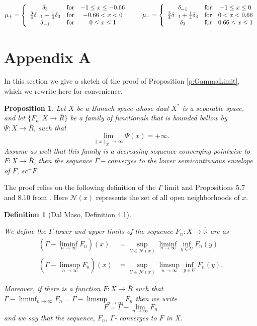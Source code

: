 \documentclass[11pt]{article}
\newcommand{\R}{\mathbb{R}}
\theoremstyle{plain}
\newtheorem*{Proposition*}{Proposition}
\newtheorem{Definition}[Lemma]{Definition}
\begin{document}
\[ \mu_+ = \left \{ 
\begin{array}{c c c}
\delta_3 & \mbox{for}& -1\leq x\leq -0.66\\
\frac{3}{4} \delta_{-1} + \frac{1}{4}\delta_3 & \mbox{for} & -0.66< x < 0\\
\delta_{-1} & \mbox{for} & 0 \leq x \leq 1
\end{array} \right.
\qquad 
\mu_- = \left \{ 
\begin{array}{c c c}
\delta_{-1} & \mbox{for}& -1\leq x\leq 0\\
\frac{3}{4} \delta_{-1} + \frac{1}{4}\delta_3 & \mbox{for} & 0< x < 0.66\\
\delta_{3} & \mbox{for} & 0.66 \leq x \leq 1
\end{array} 
\right.
 \]



\section{Appendix A}\label{s:AppendixAA}

In this section we give a sketch of the proof of Proposition \ref{p:GammaLimit}, which we rewrite here for convenience. 

\begin{Proposition*}
Let $X$ be a Banach space whose dual $X^*$ is a separable space, and let  $\{F_n: X \rightarrow \overline{R}\}$ be a family of functionals that is bounded bellow by $\Psi: X \rightarrow \overline{R}$, such that
\[ \lim_{\|x\|_X \rightarrow \infty } \Psi(x) = + \infty.\]
 Assume as well that this family is a decreasing sequence converging pointwise to $F:X \rightarrow \overline{R}$, then the sequence $\Gamma-$converges to the lower semicontinuous envelope of $F$, $sc^-F$.
\end{Proposition*}


The proof relies on the following definition of the $\Gamma$ limit and Propositions 5.7 and 8.10 from \cite{dal2012introduction}. Here $\mathcal{N}(x)$ represents the set of all open neighborhoods of $x$.

\begin{Definition}[Dal Maso, Definition 4.1]\label{d:gamma}

We define  the $\Gamma$ lower and upper limits of the sequence $F_n:X \rightarrow \overline{\R}$ are as
\begin{align*}
(\Gamma-\liminf_{n \to \infty} F_n)(x) &= \sup_{U \in \mathcal{N}(x)} \liminf_{n \to \infty} \inf_{y \in U} F_n(y)\\
(\Gamma-\limsup_{n \to \infty} F_n)(x) &= \sup_{U \in \mathcal{N}(x)} \limsup_{n \to \infty} \inf_{y \in U} F_n(y).
\end{align*}

Moreover, if there is a function $F:X\rightarrow \overline{R}$ such that $\Gamma-\liminf_{n \to \infty} F_n= \Gamma-\limsup_{n \to \infty} F_n$ then we write 
\[ F = \Gamma-\lim_{n \to \infty} F_n\]
and we say that the sequence, $F_n$, $\Gamma$- converges to $F$ in X.

\end{Definition}
\end{document}
